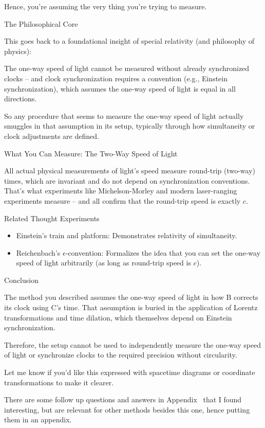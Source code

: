 \documentclass[a4paper]{article}
\theoremstyle{plain}
\theoremstyle{definition}
\begin{document}
Hence, you're assuming the very thing you're trying to measure.

The Philosophical Core

This goes back to a foundational insight of special relativity (and
philosophy of physics):

The one-way speed of light cannot be measured without already
synchronized clocks -- and clock synchronization requires a convention
(e.g., Einstein synchronization), which assumes the one-way speed of
light is equal in all directions.

So any procedure that seems to measure the one-way speed of light
actually smuggles in that assumption in its setup, typically through
how simultaneity or clock adjustments are defined.


What You Can Measure: The Two-Way Speed of Light

All actual physical measurements of light’s speed measure round-trip
(two-way) times, which are invariant and do not depend on
synchronization conventions.  That’s what experiments like
Michelson-Morley and modern laser-ranging experiments measure -- and
all confirm that the round-trip speed is exactly $c$.

Related Thought Experiments

\begin{itemize}
\item Einstein’s train and platform: Demonstrates relativity of
  simultaneity.
\item Reichenbach’s $\epsilon$-convention: Formalizes the idea that
  you can set the one-way speed of light arbitrarily (as long as
  round-trip speed is $c$).
\end{itemize}

Conclusion

The method you described assumes the one-way speed of light in how B
corrects its clock using C’s time.  That assumption is buried in the
application of Lorentz transformations and time dilation, which
themselves depend on Einstein synchronization.

Therefore, the setup cannot be used to independently measure the
one-way speed of light or synchronize clocks to the required precision
without circularity.

Let me know if you'd like this expressed with spacetime diagrams or
coordinate transformations to make it clearer.

There are some follow up questions and answers in
Appendix~\cite{app:chatgpt-on-clock-sync-and-one-way-speed-of-light}
that I found interesting, but are relevant for other methods besides
this one, hence putting them in an appendix.
\end{document}
